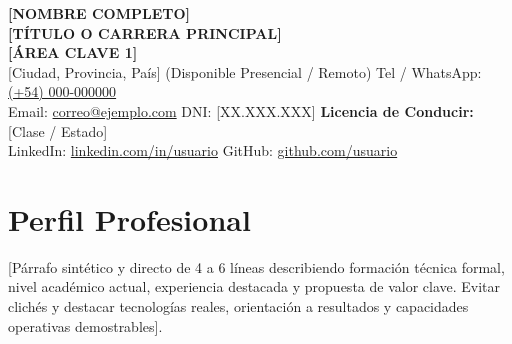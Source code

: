 \documentclass[10pt,a4paper]{article}
\begin{document}
\color{darktext}

\begin{center}
    {\fontsize{21}{25}\selectfont \bfseries \color{primary} [NOMBRE COMPLETO]} \\[2.5pt]
    {\normalsize \bfseries \color{darktext} [TÍTULO O CARRERA PRINCIPAL] \quad \textbar {}} \\[2.0pt]
    {\footnotesize \bfseries \color{secondary} [ÁREA CLAVE 1] \quad \textbar {} \quad \textbar {}} \\[3.5pt]
    
    \footnotesize
    [Ciudad, Provincia, País] (Disponible Presencial / Remoto) \quad \textbar \quad
    Tel / WhatsApp: \href{tel:+549000000000}{(+54) 000-000000} \\
    Email: \href{mailto:correo@ejemplo.com}{correo@ejemplo.com} \quad \textbar \quad
    DNI: [XX.XXX.XXX] \quad \textbar \quad
    \textbf{Licencia de Conducir:} [Clase / Estado] \\
    LinkedIn: \href{https://linkedin.com/in/usuario}{linkedin.com/in/usuario} \quad \textbar \quad
    GitHub: \href{https://github.com/usuario}{github.com/usuario}
\end{center}

\vspace{-1pt}

\section{Perfil Profesional}
[Párrafo sintético y directo de 4 a 6 líneas describiendo formación técnica formal, nivel académico actual, experiencia destacada y propuesta de valor clave. Evitar clichés y destacar tecnologías reales, orientación a resultados y capacidades operativas demostrables].

\end{document}
